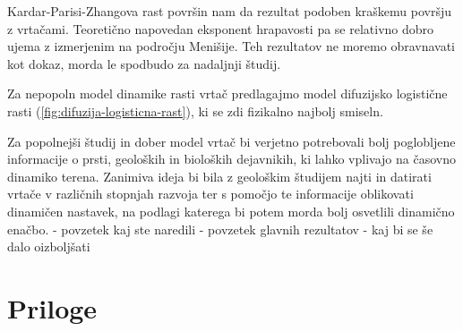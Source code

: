\documentclass[a4paper, twoside, 12pt]{book}
\begin{document}
    Kardar-Parisi-Zhangova rast površin nam da rezultat podoben kraškemu površju z vrtačami. Teoretično napovedan eksponent hrapavosti pa se relativno dobro ujema z izmerjenim na področju Menišije. Teh rezultatov ne moremo obravnavati kot dokaz, morda le spodbudo za nadaljnji študij.

    Za nepopoln model dinamike rasti vrtač predlagajmo model difuzijsko logistične rasti (\ref{fig:difuzija-logisticna-rast}), ki se zdi fizikalno najbolj smiseln.

    Za popolnejši študij in dober model vrtač bi verjetno potrebovali bolj poglobljene informacije o prsti, geoloških in bioloških dejavnikih, ki lahko vplivajo na časovno dinamiko terena. Zanimiva ideja bi bila z geološkim študijem najti in datirati vrtače v različnih stopnjah razvoja ter s pomočjo te informacije oblikovati dinamičen nastavek, na podlagi katerega bi potem morda bolj osvetlili dinamično enačbo. \newline
[TODO] \newline
- povzetek kaj ste naredili \newline
- povzetek glavnih rezultatov \newline
- kaj bi se še dalo oizboljšati \newline
[TODO]

\chapter{Priloge}
\end{document}
